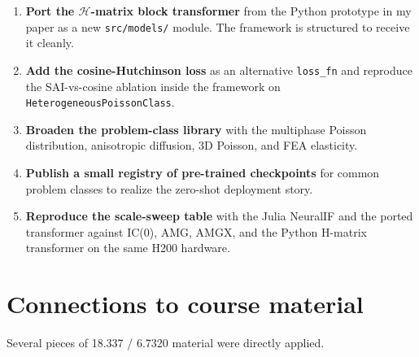 \documentclass[11pt]{article}
\newcommand{\code}[1]{\texttt{\small #1}}
\begin{document}
\begin{enumerate}[leftmargin=*, itemsep=2pt, topsep=2pt]
\item \textbf{Port the $\mathcal H$-matrix block transformer} from the Python prototype in my paper as a new \code{src/models/} module. The framework is structured to receive it cleanly.
\item \textbf{Add the cosine-Hutchinson loss} as an alternative \code{loss\_fn} and reproduce the SAI-vs-cosine ablation inside the framework on \code{HeterogeneousPoissonClass}.
\item \textbf{Broaden the problem-class library} with the multiphase Poisson distribution, anisotropic diffusion, 3D Poisson, and FEA elasticity.
\item \textbf{Publish a small registry of pre-trained checkpoints} for common problem classes to realize the zero-shot deployment story.
\item \textbf{Reproduce the scale-sweep table} with the Julia NeuralIF and the ported transformer against IC(0), AMG, AMGX, and the Python H-matrix transformer on the same H200 hardware.
\end{enumerate}

\section{Connections to course material}

Several pieces of 18.337 / 6.7320 material were directly applied.
\end{document}
